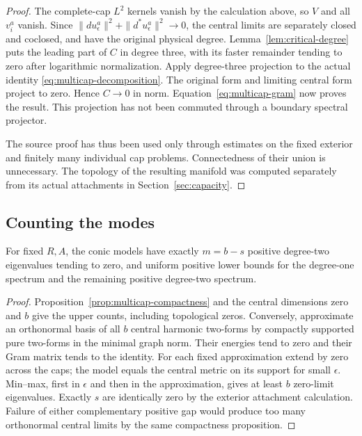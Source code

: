 \begin{proof}
The complete-cap $L^2$ kernels vanish by the calculation above, so $V$ and
all $v_i^a$ vanish. Since $\|du_\epsilon^a\|^2+\|d^*u_\epsilon^a\|^2\to0$,
the central limits are separately closed and coclosed, and have the original
physical degree. Lemma~\ref{lem:critical-degree} puts the leading part of
$C$ in degree three, with its faster remainder tending to zero after
logarithmic normalization. Apply degree-three projection to the actual
identity \eqref{eq:multicap-decomposition}. The original form and limiting
central form project to zero. Hence $C\to0$ in norm. Equation~\eqref{eq:multicap-gram}
now proves the result. This projection has not been commuted through a
boundary spectral projector.

The source proof has thus been used only through estimates on the fixed
exterior and finitely many individual cap problems. Connectedness of their
union is unnecessary. The topology of the resulting manifold was computed
separately from its actual attachments in Section~\ref{sec:capacity}.
\end{proof}

\subsection{Counting the modes}
\begin{proposition}\label{prop:model-count}
For fixed $R,A$, the conic models have exactly $m=b-s$ positive degree-two
eigenvalues tending to zero, and uniform positive lower bounds for the
degree-one spectrum and the remaining positive degree-two spectrum.
\end{proposition}
\begin{proof}
Proposition~\ref{prop:multicap-compactness} and the central dimensions zero
and $b$ give the upper counts, including topological zeros. Conversely,
approximate an orthonormal basis of all $b$ central harmonic two-forms by
compactly supported pure two-forms in the minimal graph norm. Their energies
tend to zero and their Gram matrix tends to the identity. For each fixed
approximation extend by zero across the caps; the model equals the central
metric on its support for small $\epsilon$. Min--max, first in $\epsilon$
and then in the approximation, gives at least $b$ zero-limit eigenvalues.
Exactly $s$ are identically zero by the exterior attachment calculation.
Failure of either complementary positive gap would produce too many
orthonormal central limits by the same compactness proposition.
\end{proof}
